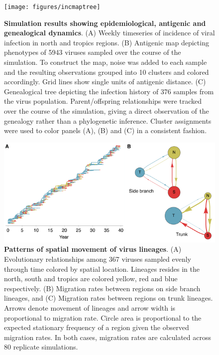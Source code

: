 \begin{figure}[H]
	\centering
	\texttt{[image: figures/incmaptree]}
	\caption{\textbf{Simulation results showing epidemiological, antigenic and genealogical dynamics}. (A) Weekly timeseries of incidence of viral infection in north and tropics regions. (B) Antigenic map depicting phenotypes of 5943 viruses sampled over the course of the simulation.  To construct the map, noise was added to each sample and the resulting observations grouped into 10 clusters and colored accordingly.  Grid lines show single units of antigenic distance. (C) Genealogical tree depicting the infection history of 376 samples from the virus population.  Parent/offspring relationships were tracked over the course of the simulation, giving a direct observation of the genealogy rather than a phylogenetic inference. Cluster assignments were used to color panels (A), (B) and (C) in a consistent fashion.}
	\label{incmaptree}
\end{figure}

\pagebreak

\begin{figure}[H]
	\centering
	\includegraphics{figures/spatial}
	\caption{\textbf{Patterns of spatial movement of virus lineages}. (A) Evolutionary relationships among 367 viruses sampled evenly through time colored by spatial location. Lineages resides in the north, south and tropics are colored yellow, red and blue respectively. (B) Migration rates between regions on side branch lineages, and (C) Migration rates between regions on trunk lineages. Arrows denote movement of lineages and arrow width is proportional to migration rate. Circle area is proportional to the expected stationary frequency of a region given the observed migration rates.  In both cases, migration rates are calculated across 80 replicate simulations.}
	\label{spatial}
\end{figure}

